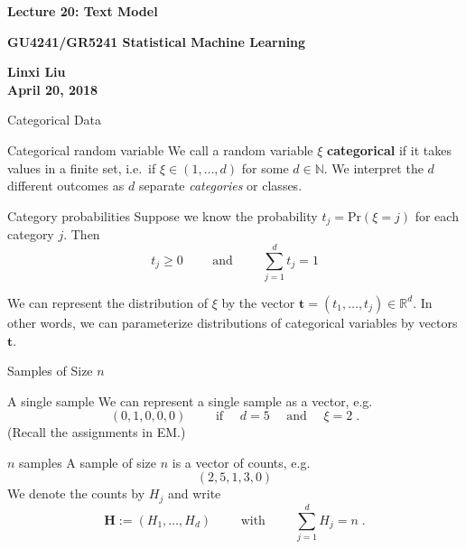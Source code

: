\documentclass[dvipsnames,mathserif]{beamer}
\begin{document}
\begin{frame}
 
\centering
{\Large \bf \centering \color{Red} Lecture 20: Text Model \\[4mm] }


{\bf GU4241/GR5241 Statistical Machine Learning\\[8mm]}

{\bf Linxi Liu\\ April 20, 2018}

\end{frame}


{\small
\def\t{\mathbf{t}}
\begin{frame}{Categorical Data}
  \begin{block}{Categorical random variable}
    We call a random variable $\xi$ \textbf{categorical} if it takes values
    in a finite set, i.e.\ if $\xi\in \left( 1,\ldots,d \right)$ for
    some $d\in\mathbb{N}$. We interpret the $d$ different outcomes as
    $d$ separate \emph{categories} or classes.
  \end{block}

\begin{block}{Category probabilities}
    Suppose we know the probability $t_j=\mbox{Pr}\left( \xi =
    j \right)$ for each category $j$. Then
    \begin{equation*}
      t_j \geq 0 \qquad \text{ and } \qquad
      \sum_{j=1}^d t_j = 1
    \end{equation*}

 We can represent the distribution of $\xi$ by the vector
    $\t=(t_1,\ldots,t_j) \in \mathbb{R}^d$. In other words, we can
    parameterize distributions of categorical variables by vectors $\mathbf{t}$.
\end{block}
  
\end{frame}

\def\H{\mathbf{H}}
\begin{frame}{Samples of Size $n$}
  \begin{block}{A single sample}
    We can represent a single sample as a vector, e.g.
    \begin{equation*}
      (0,1,0,0,0) \qquad \text{ if } \quad  d=5 \quad \text{ and }
      \quad \xi=2\;.
    \end{equation*}
    (Recall the assignments in EM.)
  \end{block}
  \begin{block}{$n$ samples}
    A sample of size $n$ is a vector of counts, e.g.
    \begin{equation*}
      (2,5,1,3,0) 
    \end{equation*}
    We denote the counts by $H_j$ and write
    \begin{equation*}
      \H:=(H_1,\ldots,H_d) \qquad \text{ with } \qquad \sum_{j=1}^d H_j = n\;.
    \end{equation*}
  \end{block}
\end{frame}

}
\end{document}
